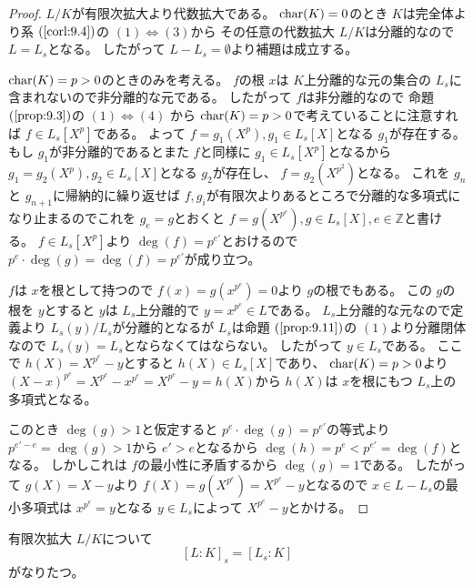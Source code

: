 \documentclass[../master_galois_theory]{subfiles}
\begin{document}
\begin{proof}
  $L/K$が有限次拡大より代数拡大である。
  $\mathrm{char}(K) = 0$のとき $K$は完全体より系 $(\mathrm{\ref{corl:9.4}})$の
  $(1) \Leftrightarrow (3)$から
  その任意の代数拡大 $L/K$は分離的なので $L = L_s$となる。
  したがって $L - L_s = \emptyset$より補題は成立する。

  $\mathrm{char}(K) = p > 0$のときのみを考える。
  $f$の根 $x$は $K$上分離的な元の集合の $L_s$に含まれないので非分離的な元である。
  したがって $f$は非分離的なので
  命題 $(\mathrm{\ref{prop:9.3}})$の $(1) \Leftrightarrow (4)$
  から $\mathrm{char}(K) = p > 0$で考えていることに注意すれば
  $f \in L_s[X^p]$である。
  よって $f = g_1(X^p) , g_1 \in L_s[X]$となる
  $g_1$が存在する。
  もし $g_1$が非分離的であるとまた $f$と同様に
  $g_1 \in L_s[X^p]$となるから $g_1 = g_2(X^p) , g_2 \in L_s[X]$となる
  $g_2$が存在し、 $f  = g_2(X^{p^2})$となる。
  これを $g_n$と $g_{n+1}$に帰納的に繰り返せば $f , g_i$が有限次よりあるところで分離的な多項式になり止まるのでこれを $g_e = g$とおくと
  $f = g(X^{p^e}) , g \in L_s[X] , e \in \mathbb{Z}$と書ける。
  $f \in L_s[X^p]$より $\deg(f) = p^{e'}$とおけるので
  $p^e \cdot \deg(g) = \deg(f) = p^{e'}$が成り立つ。

  $f$は $x$を根として持つので $f(x) = g(x^{p^e}) = 0$より $g$の根でもある。
  この $g$の根を $y$とすると $y$は $L_s$上分離的で $y = x^{p^e} \in L$である。
  $L_s$上分離的な元なので定義より $L_s(y)/L_s$が分離的となるが
  $L_s$は命題 $(\mathrm{\ref{prop:9.11}})$の $(1)$より分離閉体なので
  $L_s(y) = L_s$とならなくてはならない。
  したがって $y \in L_s$である。
  ここで $h(X) = X^{p^e} - y$とすると $h(X) \in L_s[X]$であり、
  $\mathrm{char}(K) = p > 0$より $(X - x)^{p^e} = X^{p^e} - x^{p^e} = X^{p^e} - y = h(X)$から
  $h(X)$は $x$を根にもつ $L_s$上の多項式となる。

  このとき $\deg(g) > 1$と仮定すると
  $p^e \cdot \deg(g) = p^{e'}$の等式より
  $p^{e'-e} = \deg(g) > 1$から $e' > e$となるから
  $\deg(h) = p^e < p^{e'} = \deg(f)$となる。
  しかしこれは $f$の最小性に矛盾するから $\deg(g) = 1$である。
  したがって $g(X) = X - y$より $f(X) = g(X^{p^e}) = X^{p^e} - y$となるので $x \in L - L_s$の最小多項式は $x^{p^e} = y$となる
  $y \in L_s$によって $X^{p^e} - y$とかける。

\end{proof}

\begin{prop}
  有限次拡大 $L/K$について
  \[
  [L:K]_s = [L_s:K]
  \]
  がなりたつ。
\end{prop}
\end{document}
